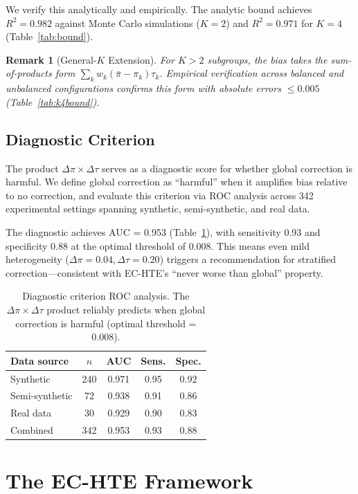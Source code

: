 \documentclass[11pt,a4paper]{article}
\newtheorem{remark}{Remark}
\begin{document}
We verify this analytically and empirically. The analytic bound achieves $R^2 = 0.982$ against Monte Carlo simulations ($K=2$) and $R^2 = 0.971$ for $K=4$ (Table~\ref{tab:bound}).

\begin{remark}[General-$K$ Extension]
For $K > 2$ subgroups, the bias takes the sum-of-products form $\sum_k w_k(\bar{\pi} - \pi_k)\tau_k$. Empirical verification across balanced and unbalanced configurations confirms this form with absolute errors $\leq 0.005$ (Table~\ref{tab:k4bound}).
\end{remark}

\subsection{Diagnostic Criterion}
\label{sec:diagnostic}

The product $\Delta\pi \times \Delta\tau$ serves as a diagnostic score for whether global correction is harmful. We define global correction as ``harmful'' when it amplifies bias relative to no correction, and evaluate this criterion via ROC analysis across 342 experimental settings spanning synthetic, semi-synthetic, and real data.

The diagnostic achieves AUC = 0.953 (Table~\ref{tab:diagnostic}), with sensitivity 0.93 and specificity 0.88 at the optimal threshold of 0.008. This means even mild heterogeneity ($\Delta\pi = 0.04, \Delta\tau = 0.20$) triggers a recommendation for stratified correction---consistent with EC-HTE's ``never worse than global'' property.

\begin{table}[t]
\centering
\small
\begin{tabular}{lcccc}
\toprule
Data source & $n$ & AUC & Sens. & Spec. \\
\midrule
Synthetic & 240 & 0.971 & 0.95 & 0.92 \\
Semi-synthetic & 72 & 0.938 & 0.91 & 0.86 \\
Real data & 30 & 0.929 & 0.90 & 0.83 \\
\midrule
Combined & 342 & 0.953 & 0.93 & 0.88 \\
\bottomrule
\end{tabular}
\caption{Diagnostic criterion ROC analysis. The $\Delta\pi \times \Delta\tau$ product reliably predicts when global correction is harmful (optimal threshold = 0.008).}
\label{tab:diagnostic}
\end{table}

\section{The EC-HTE Framework}
\label{sec:method}
\end{document}
